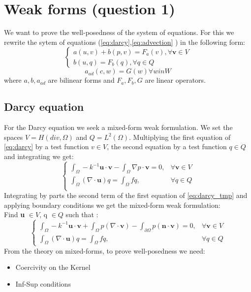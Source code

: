 \documentclass[conference]{IEEEtran}
\begin{document}
\section{Weak forms (question 1)}
We want to prove the well-posedness of the system of equations. For this we rewrite the sytem of equations (\ref{eq:darcy},\ref{eq:advection} ) in the following form:
\begin{equation}
    \begin{cases}
      a(u,v)+b(p,v) = F_a(v) , \forall \textbf{v} \in V \\
      b(u,q) = F_b(q) , \forall q \in Q
    \end{cases}
\end{equation}
\begin{equation}
    a_{ad}(c,w)=G(w) \forall w in W
\end{equation}
where $a,b,a_{ad}$ are bilinear forms and $F_a, F_b, G$ are linear operators.

\subsection{Darcy equation}
For the Darcy equation we seek a mixed-form weak formulation. We set the spaces
$V=H(div,\Omega)$ and $Q=L^2(\Omega)$. Multiplying the first equation of \ref{eq:darcy} by a test function $v\in V$, the second equation by a test function $q\in Q$ and integrating we get:
\begin{equation}
    \begin{cases}
      \int_\Omega-k^{-1}\textbf{u}\cdot \textbf{v} 
      -\int_\Omega \nabla p \cdot \textbf{v} = 0 , & \forall \textbf{v} \in V  \\
      \int_\Omega (\nabla \cdot \textbf{u})q = \int_\Omega fq, & \forall q \in Q \\
    \end{cases}
    \label{eq:darcy_tmp}
\end{equation}
Integrating by parts the second term of the first equation of \ref{eq:darcy_tmp} and applying boundary conditions we get the mixed-form weak formulation:\\
Find \textbf{u} $\in V$, q $\in Q$ such that  :
\begin{equation}
    \begin{cases}
      \int_\Omega -k^{-1}\textbf{u}\cdot \textbf{v} + \int_\Omega  p (\nabla\cdot \textbf{v})
      - \int_{\partial\Omega}  p(\textbf{n}\cdot \textbf{v})   = 0 , & \forall \textbf{v} \in V  \\
      \int_\Omega (\nabla \cdot \textbf{u})q = \int_\Omega fq, & \forall q \in Q 
    \end{cases}
    \label{eq:darcy_weak}
\end{equation}
From the theory on mixed-forms, to prove well-posedness we need:
\begin{itemize}
\item Coercivity on the Kernel
\item Inf-Sup conditions
\end{itemize}
\end{document}
